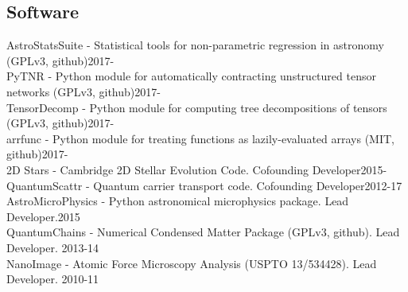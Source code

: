 \documentclass[line, margin]{res3address}
\begin{document}
\begin{resume}
\section{Software}
AstroStatsSuite - Statistical tools for non-parametric regression in astronomy (GPLv3, github)\hfill 2017-\\
PyTNR - Python module for automatically contracting unstructured tensor networks (GPLv3, github)\hfill 2017-\\
TensorDecomp - Python module for computing tree decompositions of tensors (GPLv3, github)\hfill 2017-\\
arrfunc - Python module for treating functions as lazily-evaluated arrays (MIT, github)\hfill 2017-\\
2D Stars - Cambridge 2D Stellar Evolution Code. Cofounding Developer\hfill 2015-\\
QuantumScattr - Quantum carrier transport code. Cofounding Developer\hfill 2012-17\\
AstroMicroPhysics - Python astronomical microphysics package. Lead Developer.\hfill 2015\\
QuantumChains - Numerical Condensed Matter Package (GPLv3, github). Lead Developer. \hfill 2013-14\\
NanoImage - Atomic Force Microscopy Analysis (USPTO 13/534428). Lead Developer. \hfill 2010-11\\


\end{resume}
\end{document}
